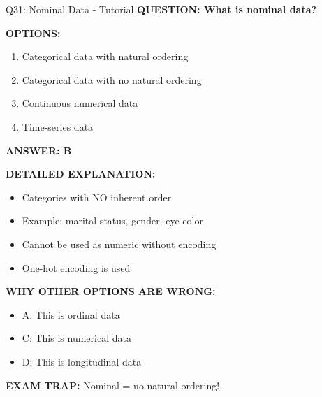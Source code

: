 \documentclass[8pt]{beamer}
\begin{document}
	\begin{frame}{Q31: Nominal Data - Tutorial}
		\fontsize{6.5}{7.5}\selectfont
		\textbf{QUESTION: What is nominal data?}
		
		\vspace{0.1cm}
		\textbf{OPTIONS:}
		\begin{enumerate}
			\item Categorical data with natural ordering
			\item Categorical data with no natural ordering
			\item Continuous numerical data
			\item Time-series data
		\end{enumerate}
		
		\vspace{0.1cm}
		\textcolor{myblue}{\textbf{ANSWER: B}}
		
		\vspace{0.1cm}
		\textbf{DETAILED EXPLANATION:}
		\begin{itemize}
			\item Categories with NO inherent order
			\item Example: marital status, gender, eye color
			\item Cannot be used as numeric without encoding
			\item One-hot encoding is used
		\end{itemize}
		
		\vspace{0.1cm}
		\textcolor{myred}{\textbf{WHY OTHER OPTIONS ARE WRONG:}}
		\begin{itemize}
			\item \textcolor{myred}{A:} This is ordinal data
			\item \textcolor{myred}{C:} This is numerical data
			\item \textcolor{myred}{D:} This is longitudinal data
		\end{itemize}
		
		\textcolor{myred}{\textbf{EXAM TRAP:}} Nominal = \textcolor{myblue}{no natural ordering}!
	\end{frame}
	
\end{document}
